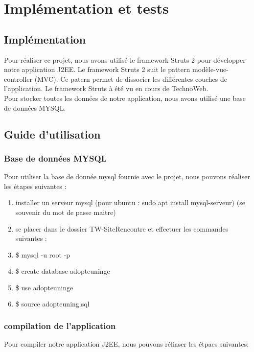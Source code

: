 \chapter{Implémentation et tests}
\section{Implémentation}

	Pour réaliser ce projet, nous avons utilisé le framework Struts 2 pour développer notre application J2EE. Le framework Struts 2 suit le pattern modèle-vue-controller (MVC). Ce patern permet de dissocier les différentes couches de l'application. Le framework Struts à été vu en cours de TechnoWeb.\\
	Pour stocker toutes les données de notre application, nous avons utilisé une base de données MYSQL. \\
	
\section{Guide d'utilisation}
\subsection{Base de données MYSQL}
	Pour utiliser la base de donnée mysql fournie avec le projet, nous pouvons réaliser les étapes suivantes :
	\begin{enumerate}
		\item installer un serveur mysql (pour ubuntu : sudo apt install mysql-serveur) (se souvenir du mot de passe maitre)
		\item se placer dans le dossier TW-SiteRencontre et effectuer les commandes suivantes :
		\item \$ mysql -u root -p
		\item \$ create database adopteuninge 
		\item \$ use adopteuninge
		\item \$ source adopteuning.sql
	\end{enumerate}

\subsection{compilation de l'application}
	Pour compiler notre application J2EE, nous pouvons réliaser les étpaes suivantes:
	
